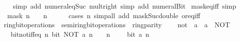 \begin{isabellebody}
%
\isadelimproof
\ \ %
\endisadelimproof
%
\isatagproof
{}\isamarkupfalse%
\ {\isacharparenleft}{\kern0pt}simp\ add{\isacharcolon}{\kern0pt}\ numeral{\isacharunderscore}{\kern0pt}eq{\isacharunderscore}{\kern0pt}Suc\ mult{\isacharunderscore}{\kern0pt}{}{\isacharunderscore}{\kern0pt}right{\isacharparenright}{\kern0pt}\ {\isacharparenleft}{\kern0pt}simp\ add{\isacharcolon}{\kern0pt}\ numeral{\isacharunderscore}{\kern0pt}Bit{}{\isacharparenright}{\kern0pt}%
\endisatagproof
{\isafoldproof}%
%
\isadelimproof
\isanewline
%
\endisadelimproof
\isanewline
{}\isamarkupfalse%
\ mask{\isacharunderscore}{\kern0pt}eq{\isacharunderscore}{\kern0pt}{}{\isacharunderscore}{\kern0pt}iff\ {\isacharbrackleft}{\kern0pt}simp{\isacharbrackright}{\kern0pt}{\isacharcolon}{\kern0pt}\isanewline
\ \ {\isacartoucheopen}mask\ n\ {\isacharequal}{\kern0pt}\ {}\ {\isasymlongleftrightarrow}\ n\ {\isacharequal}{\kern0pt}\ {}{\isacartoucheclose}\isanewline
%
\isadelimproof
\ \ %
\endisadelimproof
%
\isatagproof
{}\isamarkupfalse%
\ {\isacharparenleft}{\kern0pt}cases\ n{\isacharparenright}{\kern0pt}\ {\isacharparenleft}{\kern0pt}simp{\isacharunderscore}{\kern0pt}all\ add{\isacharcolon}{\kern0pt}\ mask{\isacharunderscore}{\kern0pt}Suc{\isacharunderscore}{\kern0pt}double\ or{\isacharunderscore}{\kern0pt}eq{\isacharunderscore}{\kern0pt}{}{\isacharunderscore}{\kern0pt}iff{\isacharparenright}{\kern0pt}%
\endisatagproof
{\isafoldproof}%
%
\isadelimproof
\isanewline
%
\endisadelimproof
\isanewline
{}\isamarkupfalse%
\isanewline
\isanewline
{}\isamarkupfalse%
\ ring{\isacharunderscore}{\kern0pt}bit{\isacharunderscore}{\kern0pt}operations\ {\isacharequal}{\kern0pt}\ semiring{\isacharunderscore}{\kern0pt}bit{\isacharunderscore}{\kern0pt}operations\ {\isacharplus}{\kern0pt}\ ring{\isacharunderscore}{\kern0pt}parity\ {\isacharplus}{\kern0pt}\isanewline
\ \ \ not\ {\isacharcolon}{\kern0pt}{\isacharcolon}{\kern0pt}\ {\isacartoucheopen}{\isacharprime}{\kern0pt}a\ {\isasymRightarrow}\ {\isacharprime}{\kern0pt}a{\isacartoucheclose}\ \ {\isacharparenleft}{\kern0pt}{\isacartoucheopen}NOT{\isacartoucheclose}{\isacharparenright}{\kern0pt}\isanewline
\ \ \ bit{\isacharunderscore}{\kern0pt}not{\isacharunderscore}{\kern0pt}iff{\isacharunderscore}{\kern0pt}eq{\isacharcolon}{\kern0pt}\ {\isacartoucheopen}{\isasymAnd}n{\isachardot}{\kern0pt}\ bit\ {\isacharparenleft}{\kern0pt}NOT\ a{\isacharparenright}{\kern0pt}\ n\ {\isasymlongleftrightarrow}\ {}\ {\isacharcircum}{\kern0pt}\ n\ {\isasymnoteq}\ {}\ {\isasymand}\ {\isasymnot}\ bit\ a\ n{\isacartoucheclose}\isanewline

\end{isabellebody}
